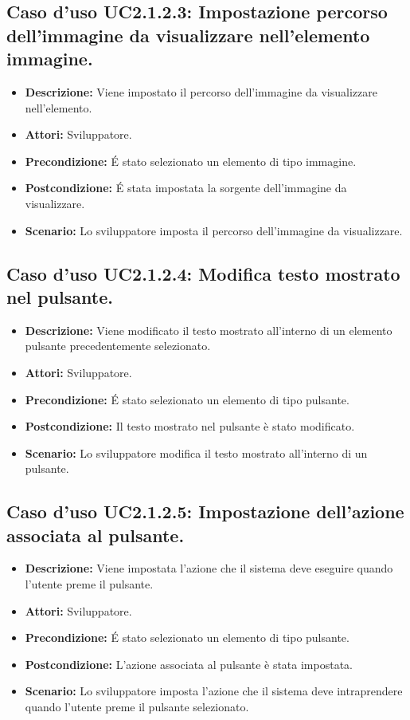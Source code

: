 \subsection{Caso d'uso UC2.1.2.3: Impostazione percorso dell'immagine da visualizzare nell'elemento immagine.}
\begin{itemize}
\item[]\textbf{Descrizione:} Viene impostato il percorso dell'immagine da visualizzare nell'elemento.
\item[]\textbf{Attori:} Sviluppatore. 
\item[]\textbf{Precondizione:} \'E stato selezionato un elemento di tipo immagine. 
\item[]\textbf{Postcondizione:} \'E stata impostata la sorgente dell'immagine da visualizzare. 
\item[]\textbf{Scenario:}
Lo sviluppatore imposta il percorso dell'immagine da visualizzare. 
\end{itemize}

\subsection{Caso d'uso UC2.1.2.4: Modifica testo mostrato nel pulsante.}
\begin{itemize}
\item[]\textbf{Descrizione:} Viene modificato il testo mostrato all'interno di un elemento pulsante precedentemente selezionato.
\item[]\textbf{Attori:} Sviluppatore. 
\item[]\textbf{Precondizione:} \'E stato selezionato un elemento di tipo pulsante. 
\item[]\textbf{Postcondizione:} Il testo mostrato nel pulsante è stato modificato. 
\item[]\textbf{Scenario:}
Lo sviluppatore modifica il testo mostrato all'interno di un pulsante. 
\end{itemize}

\subsection{Caso d'uso UC2.1.2.5: Impostazione dell'azione associata al pulsante.}
\begin{itemize}
\item[]\textbf{Descrizione:} Viene impostata l'azione che il sistema deve eseguire quando l'utente preme il pulsante.
\item[]\textbf{Attori:} Sviluppatore. 
\item[]\textbf{Precondizione:} \'E stato selezionato un elemento di tipo pulsante. 
\item[]\textbf{Postcondizione:} L'azione associata al pulsante è stata impostata. 
\item[]\textbf{Scenario:}
Lo sviluppatore imposta l'azione che il sistema deve intraprendere quando l'utente preme il pulsante selezionato. 
\end{itemize}

